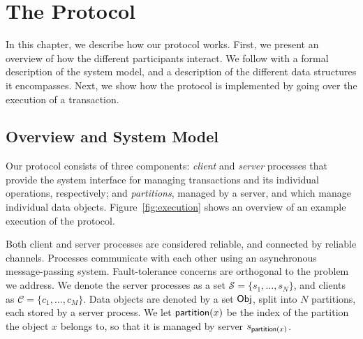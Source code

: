 \cleardoublepage
\chapter{The Protocol}
\label{protocol_chapter}


In this chapter, we describe how our protocol  works. First, we present an overview of how the different participants interact. We follow with a formal description of the system model, and a description of the different data structures it encompasses. Next, we show how the protocol is implemented by going over the execution of a transaction.

\section{Overview and System Model}

Our protocol consists of three components: \emph{client} and \emph{server} processes that provide the system interface for managing transactions and its individual operations, respectively; and \emph{partitions}, managed by a server, and which manage individual data objects. Figure~\ref{fig:execution} shows an overview of an example execution of the protocol.

Both client and server processes are considered reliable, and connected by reliable channels. Processes communicate with each other using an asynchronous message-passing system. Fault-tolerance concerns are orthogonal to the problem we address. We denote the server processes as a set $\mathcal{S} = \{s_1, \dots, s_N\}$, and clients as $\mathcal{C} = \{c_1, \dots, c_M\}$. Data objects are denoted by a set ${\sf Obj}$, split into $N$ partitions, each stored by a server process. We let $\mathsf{partition}(x)$ be the index of the partition the object $x$ belongs to, so that it is managed by server $s_{\mathsf{partition}(x)}$.

